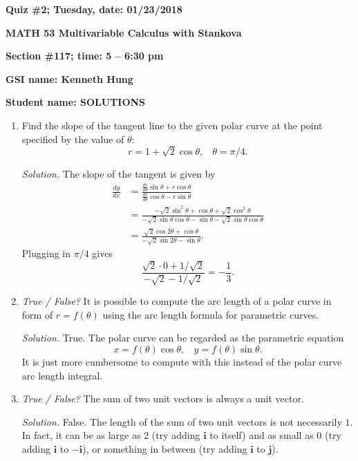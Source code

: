 \documentclass{article}
\begin{document}
{\bf Quiz \#2; Tuesday, date: 01/23/2018}

{\bf MATH 53 Multivariable Calculus with Stankova}

{\bf Section \#117; time: 5 -- 6:30 pm}

{\bf GSI name: Kenneth Hung}

{\bf Student name: SOLUTIONS}

\vspace*{0.25in}

\begin{enumerate}
\item Find the slope of the tangent line to the given polar curve at the point specified by the value of $\theta$:
\[
r = 1 + \sqrt{2} \cos \theta, ~~~~ \theta = \pi / 4.
\]

{\em Solution.} The slope of the tangent is given by
\begin{align*}
\frac{dy}{dx} & = \frac{\frac{dr}{d\theta} \sin \theta + r \cos \theta}{\frac{dr}{d\theta} \cos \theta - r \sin \theta} \\
& = \frac{-\sqrt{2} \sin^2 \theta + \cos \theta + \sqrt{2} \cos^2 \theta}{-\sqrt{2} \sin \theta \cos\theta - \sin \theta - \sqrt{2} \sin \theta \cos \theta} \\
& = \frac{\sqrt{2} \cos 2\theta + \cos\theta}{-\sqrt{2} \sin 2\theta - \sin\theta}.
\end{align*}
Plugging in $\pi / 4$ gives
\[
\frac{\sqrt{2} \cdot 0 + 1 / \sqrt{2}}{-\sqrt{2} - 1 / \sqrt{2}} = -\frac{1}{3}.
\]

\item {\em True / False?} It is possible to compute the arc length of a polar curve in form of $r = f(\theta)$ using the arc length formula for parametric curves.

{\em Solution.} True. The polar curve can be regarded as the parametric equation
\[
x = f(\theta) \cos \theta, ~~~~ y = f(\theta) \sin \theta.
\]
It is just more cumbersome to compute with this instead of the polar curve arc length integral.

\item {\em True / False?} The sum of two unit vectors is always a unit vector.

{\em Solution.} False. The length of the sum of two unit vectors is not necessarily $1$. In fact, it can be as large as $2$ (try adding $\mathbf{i}$ to itself) and as small as $0$ (try adding $\mathbf{i}$ to $-\mathbf{i}$), or something in between (try adding $\mathbf{i}$ to $\mathbf{j}$).
\end{enumerate}
\end{document}
